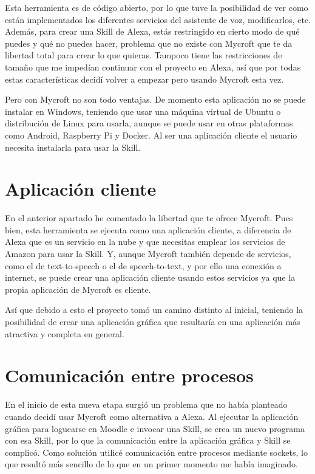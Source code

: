 Esta herramienta es de código abierto, por lo que tuve la posibilidad de ver como están implementados los diferentes servicios del asistente de voz, modificarlos, etc. Además, para crear una Skill de Alexa, estás restringido en cierto modo de qué puedes y qué no puedes hacer, problema que no existe con Mycroft que te da libertad total para crear lo que quieras. Tampoco tiene las restricciones de tamaño que me impedían continuar con el proyecto en Alexa, así que por todas estas características decidí volver a empezar pero usando Mycroft esta vez.

Pero con Mycroft no son todo ventajas. De momento esta aplicación no se puede instalar en Windows, teniendo que usar una máquina virtual de Ubuntu o distribución de Linux para usarla, aunque se puede usar en otras plataformas como Android, Raspberry Pi y Docker. Al ser una aplicación cliente el usuario necesita instalarla para usar la Skill.

\section{Aplicación cliente}

En el anterior apartado he comentado la libertad que te ofrece Mycroft. Pues bien, esta herramienta se ejecuta como una aplicación cliente, a diferencia de Alexa que es un servicio en la nube y que necesitas emplear los servicios de Amazon para usar la Skill. Y, aunque Mycroft también depende de servicios, como el de text-to-speech o el de speech-to-text, y por ello una conexión a internet, se puede crear una aplicación cliente usando estos servicios ya que la propia aplicación de Mycroft es cliente.

Así que debido a esto el proyecto tomó un camino distinto al inicial, teniendo la posibilidad de crear una aplicación gráfica que resultaría en una aplicación más atractiva y completa en general.

\section{Comunicación entre procesos}

En el inicio de esta nueva etapa surgió un problema que no había planteado cuando decidí usar Mycroft como alternativa a Alexa. Al ejecutar la aplicación gráfica para loguearse en Moodle e invocar una Skill, se crea un nuevo programa con esa Skill, por lo que la comunicación entre la aplicación gráfica y Skill se complicó. Como solución utilicé comunicación entre procesos mediante sockets, lo que resultó más sencillo de lo que en un primer momento me había imaginado.

